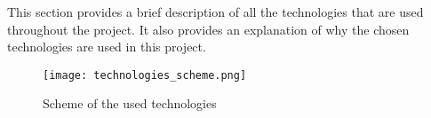 This section provides a brief description of all the technologies that are used throughout the project. It also provides an explanation of why the chosen technologies are used in this project.

\begin{figure}[!h]
  \centering
  \texttt{[image: technologies\_scheme.png]}
  \caption{Scheme of the used technologies}
  \label{fig:technologies}
\end{figure}